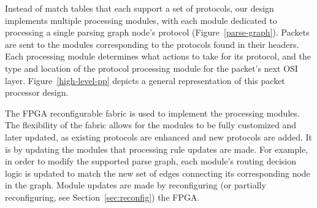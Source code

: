 Instead of match tables that each support a set of protocols, our design implements multiple processing modules, with each module dedicated to processing a single parsing graph node's protocol (Figure~\ref{parse-graph}).
Packets are sent to the modules corresponding to the protocols found in their headers.
Each processing module determines what actions to take for its protocol, and the type and location of the protocol processing module for the packet's next OSI layer.
Figure~\ref{high-level-pp} depicts a general representation of this packet processor design.

The FPGA reconfigurable fabric is used to implement the processing modules.
The flexibility of the fabric allows for the modules to be fully customized and later updated, as existing protocols are enhanced and new protocols are added.
It is by updating the modules that processing rule updates are made.
For example, in order to modify the supported parse graph, each module's routing decision logic is updated to match the new set of edges connecting its corresponding node in the graph.
Module updates are made by reconfiguring (or partially reconfiguring, see Section~\ref{sec:reconfig}) the FPGA.

